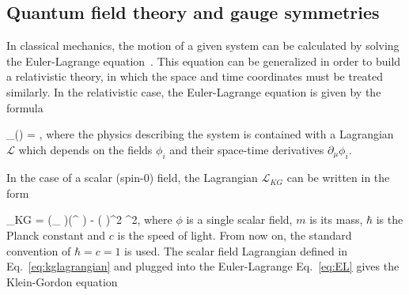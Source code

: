 


\subsection{Quantum field theory and gauge symmetries~\label{sec:QFT}}

In classical mechanics, the motion of a given system can be calculated by solving the Euler-Lagrange equation~\cite{9783527411887}. This equation can be generalized in order to build a relativistic theory, in which the space and time coordinates must be treated similarly. In the relativistic case, the Euler-Lagrange equation is given by the formula

{
 \partial_{\mu}\left (\right) = ,
}
where the physics describing the system is contained with a Lagrangian $\mathcal{L}$ which depends on the fields $\phi_{i}$ and their space-time derivatives $\partial_{\mu}\phi_{i}$. 

In the case of a scalar (spin-0) field, the Lagrangian $\mathcal{L}_{KG}$ can be written in the form 

{
 _{KG} = (\partial_{\mu} \phi)(\partial^{\mu} \phi) -  \left( \right)^{2} \phi^{2},
}
where $\phi$ is a single scalar field, $m$ is its mass, $\hbar$ is the Planck constant and $c$ is the speed of light. From now on, the standard convention of $\hbar = c = 1$ is used. The scalar field Lagrangian defined in Eq.~\ref{eq:kglagrangian} and plugged into the Euler-Lagrange Eq.~\ref{eq:EL} gives the Klein-Gordon equation

